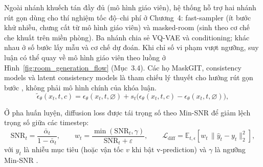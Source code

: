 \documentclass[oneside,a4paper,12pt]{extreport}
\begin{document}
Ngoài nhánh khuếch tán đầy đủ (mô hình giáo viên), hệ thống hỗ trợ hai nhánh rút gọn dùng cho thí nghiệm tốc độ--chi phí ở Chương~4: fast-sampler (ít bước khử nhiễu, chưng cất từ mô hình giáo viên) và masked-room (sinh theo cơ chế che khuất trên miền phòng). Ba nhánh chia sẻ VQ-VAE và conditioning; khác nhau ở số bước lấy mẫu và cơ chế dự đoán. Khi chỉ số vi phạm vượt ngưỡng, suy luận có thể quay về mô hình giáo viên theo luồng ở Hình~\ref{fig:room_generation_flow} (Mục~3.4). Các họ MaskGIT, consistency models và latent consistency models là tham chiếu lý thuyết cho hướng rút gọn bước \cite{chang2022maskgit,song2023consistency,luo2023lcm}, không phải mô hình chính của khóa luận.
\begin{equation}
\tilde{\epsilon}_{\theta}(x_t,t,c)=\epsilon_{\theta}(x_t,t,\varnothing)
+ s_t\Big(\epsilon_{\theta}(x_t,t,c)-\epsilon_{\theta}(x_t,t,\varnothing)\Big),
\end{equation}

Ở pha huấn luyện, diffusion loss được tái trọng số theo Min-SNR để giảm lệch trọng số giữa các timestep:
\begin{equation}
\mathrm{SNR}_t = \frac{\bar{\alpha}_t}{1-\bar{\alpha}_t}, \qquad
w_t = \frac{\min(\mathrm{SNR}_t,\gamma)}{\mathrm{SNR}_t+\varepsilon}, \qquad
\mathcal{L}_{\text{diff}} = \mathbb{E}_{t,\epsilon}\!\left[w_t\,\lVert \hat{y}_t - y_t\rVert_2^2\right],
\end{equation}
với $y_t$ là nhiễu mục tiêu (hoặc vận tốc $v$ khi bật v-prediction) và $\gamma$ là ngưỡng Min-SNR \cite{hang2023minsnr}.
\end{document}
